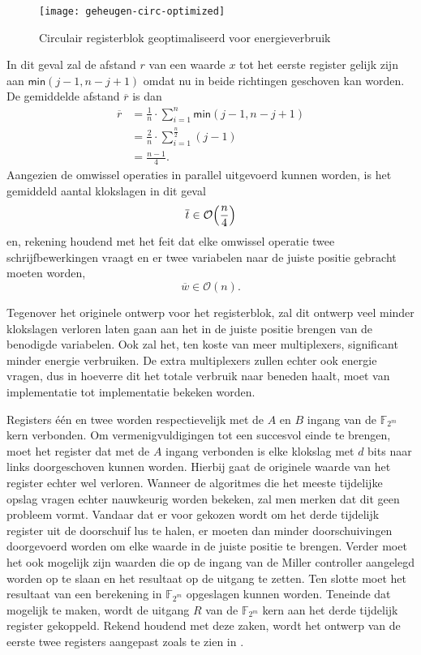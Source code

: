 \begin{figure}[h]
	\centering
		\texttt{[image: geheugen-circ-optimized]}
		\caption{Circulair registerblok geoptimaliseerd voor energieverbruik\label{figuur-implementatie-miller-geheugen-circ-optimized}}
\end{figure}

In dit geval zal de afstand $r$ van een waarde $x$ tot het eerste register gelijk zijn aan $\textsf{min}(j - 1, n - j + 1)$ omdat nu in beide richtingen geschoven kan worden. De gemiddelde afstand $\overline{r}$ is dan
\[\begin{aligned}
\overline{r}	&= \frac{1}{n} \cdot \sum_{i = 1}^{n} \textsf{min}(j - 1, n - j + 1)\\
	&= \frac{2}{n} \cdot \sum_{i = 1}^{\frac{n}{2}} (j - 1)\\
	&= \frac{n - 1}{4}.
\end{aligned}\]
Aangezien de omwissel operaties in parallel uitgevoerd kunnen worden, is het gemiddeld aantal klokslagen in dit geval
\[\overline{t} \in \mathcal{O}  \Bigl( \frac{n}{4} \Bigr)\]
en, rekening houdend met het feit dat elke omwissel operatie twee schrijfbewerkingen vraagt en er twee variabelen naar de juiste positie gebracht moeten worden,
\[\overline{w} \in \mathcal{O}(n).\]

Tegenover het originele ontwerp voor het registerblok, zal dit ontwerp veel minder klokslagen verloren laten gaan aan het in de juiste positie brengen van de benodigde variabelen. Ook zal het, ten koste van meer multiplexers, significant minder energie verbruiken. De extra multiplexers zullen echter ook energie vragen, dus in hoeverre dit het totale verbruik naar beneden haalt, moet van implementatie tot implementatie bekeken worden. 

Registers \'e\'en en twee worden respectievelijk met de $A$ en $B$ ingang van de $\mathbb{F}_{2^m}$ kern verbonden. Om vermenigvuldigingen tot een succesvol einde te brengen, moet het register dat met de $A$ ingang verbonden is elke klokslag met $d$ bits naar links doorgeschoven kunnen worden. Hierbij gaat de originele waarde van het register echter wel verloren. Wanneer de algoritmes die het meeste tijdelijke opslag vragen echter nauwkeurig worden bekeken, zal men merken dat dit geen probleem vormt. Vandaar dat er voor gekozen wordt om het derde tijdelijk register uit de doorschuif lus te halen, er moeten dan minder doorschuivingen doorgevoerd worden om elke waarde in de juiste positie te brengen. Verder moet het ook mogelijk zijn waarden die op de ingang van de Miller controller aangelegd worden op te slaan en het resultaat op de uitgang te zetten. Ten slotte moet het resultaat van een berekening in $\mathbb{F}_{2^m}$ opgeslagen kunnen worden. Teneinde dat mogelijk te maken, wordt de uitgang $R$ van de $\mathbb{F}_{2^m}$ kern aan het derde tijdelijk register gekoppeld. Rekend houdend met deze zaken, wordt het ontwerp van de eerste twee registers aangepast zoals te zien in .


